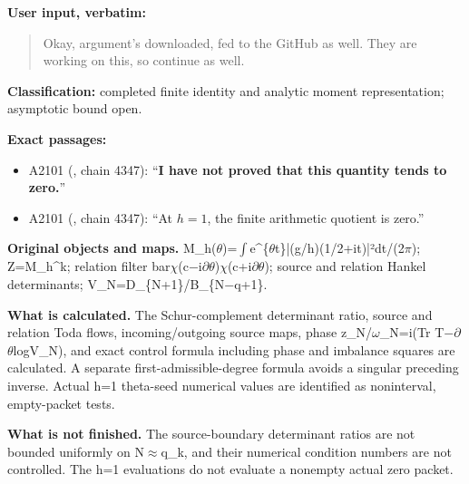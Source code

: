 \documentclass[10pt,a4paper,oneside]{report}
\providecommand{\tightlist}{\setlength{\itemsep}{0pt}\setlength{\parskip}{0pt}}
\begin{document}
\textbf{User input, verbatim:}

\begin{quote}
Okay, argument's downloaded, fed to the GitHub as well. They are working
on this, so continue as well.
\end{quote}

\textbf{Classification:} completed finite identity and analytic moment
representation; asymptotic bound open.

\textbf{Exact passages:}

\begin{itemize}
\tightlist
\item
  A2101 (\protect{}, chain
  4347): ``\textbf{I have not proved that this quantity tends to
  zero.}''
\item
  A2101 (\protect{}, chain
  4347): ``At \(h=1\), the finite arithmetic quotient is zero.''
\end{itemize}

\textbf{Original objects and maps.}
M\_h(\allowbreak{}\ensuremath{θ}\allowbreak{})=\allowbreak{}\ensuremath{∫}\allowbreak{}e\textasciicircum{}\{\allowbreak{}\ensuremath{θ}\allowbreak{}t\}|(g/h)(1/2+it)|²dt/(2\allowbreak{}\ensuremath{π}\allowbreak{});
Z=M\_h\^{}k; relation filter
bar\allowbreak{}\ensuremath{χ}\allowbreak{}(c\allowbreak{}\ensuremath{−}\allowbreak{}i\allowbreak{}\ensuremath{∂}\allowbreak{}\allowbreak{}\ensuremath{θ}\allowbreak{})\allowbreak{}\ensuremath{χ}\allowbreak{}(c+i\allowbreak{}\ensuremath{∂}\allowbreak{}\allowbreak{}\ensuremath{θ}\allowbreak{});
source and relation Hankel determinants;
V\_N=D\_\{N+1\}/B\_\{N\allowbreak{}\ensuremath{−}\allowbreak{}q+1\}.

\textbf{What is calculated.} The Schur-complement determinant ratio,
source and relation Toda flows, incoming/outgoing source maps, phase
z\_N/\allowbreak{}\ensuremath{ω}\allowbreak{}\_N=i(Tr
T\allowbreak{}\ensuremath{−}\allowbreak{}\allowbreak{}\ensuremath{∂}\allowbreak{}\allowbreak{}\ensuremath{θ}\allowbreak{}logV\_N),
and exact control formula including phase and imbalance squares are
calculated. A separate first-admissible-degree formula avoids a singular
preceding inverse. Actual h=1 theta-seed numerical values are identified
as noninterval, empty-packet tests.

\textbf{What is not finished.} The source-boundary determinant ratios
are not bounded uniformly on
N\allowbreak{}\ensuremath{≈}\allowbreak{}q\_k, and their numerical
condition numbers are not controlled. The h=1 evaluations do not
evaluate a nonempty actual zero packet.
\end{document}
